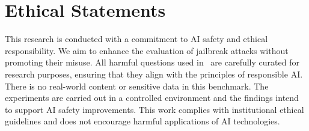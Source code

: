 
\section*{Ethical Statements}

This research is conducted with a commitment to AI safety and ethical responsibility. We aim to enhance the evaluation of jailbreak attacks without promoting their misuse. All harmful questions used in \bench~are carefully curated for research purposes, ensuring that they align with the principles of responsible AI. There is no real-world content or sensitive data in this benchmark. The experiments are carried out in a controlled environment and the findings intend to support AI safety improvements. This work complies with institutional ethical guidelines and does not encourage harmful applications of AI technologies.